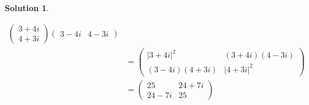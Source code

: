 \documentclass[10pt]{article}
\theoremstyle{definition}
\newtheorem{soln}{Solution}
\begin{document}
\begin{soln}
\begin{enumerate}[label=(\alph*)]
\begin{enumerate} [label=(\roman*)]
\begin{align*}
                    \begin{pmatrix}
                      3+4i \\
                      4+3i
                    \end{pmatrix}
                    \begin{pmatrix}
                      3-4i & 4-3i
                    \end{pmatrix}                            \\
                                         & =
                    \begin{pmatrix}
                      \left|3+4i\right|^2 & (3+4i)(4-3i)        \\
                      (3-4i)(4+3i)        & \left|4+3i\right|^2
                    \end{pmatrix} \\
                                         & =
                    \begin{pmatrix}
                      25    & 24+7i \\
                      24-7i & 25
                    \end{pmatrix}
                  \end{align*}
          \end{enumerate}
  \end{enumerate}
\end{soln}
\newpage
\end{document}
